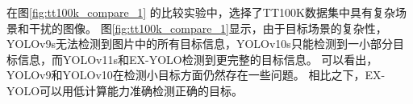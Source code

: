 
在图\ref{fig:tt100k_compare_1}
的比较实验中，选择了TT100K数据集中具有复杂场景和干扰的图像。
图\ref{fig:tt100k_compare_1}显示，由于目标场景的复杂性，YOLOv9s无法检测到图片中的所有目标信息，YOLOv10s只能检测到一小部分目标信息，而YOLOv11s和EX-YOLO检测到更完整的目标信息。 可以看出，YOLOv9和YOLOv10在检测小目标方面仍然存在一些问题。 相比之下，EX-YOLO可以用低计算能力准确检测正确的目标。

